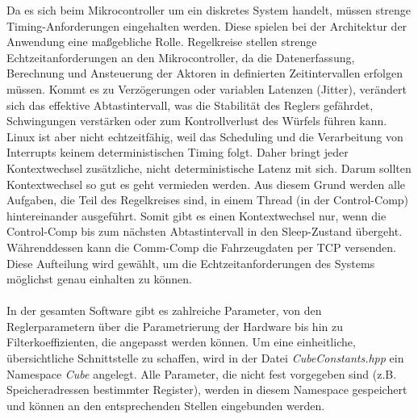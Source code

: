         Da es sich beim Mikrocontroller um ein diskretes System handelt, müssen strenge Timing-Anforderungen eingehalten werden. Diese spielen bei der Architektur der Anwendung eine maßgebliche Rolle. Regelkreise stellen strenge Echtzeitanforderungen an den Mikrocontroller, da die Datenerfassung, Berechnung und Ansteuerung der Aktoren in definierten Zeitintervallen erfolgen müssen. Kommt es zu Verzögerungen oder variablen Latenzen (Jitter), verändert sich das effektive Abtastintervall, was die Stabilität des Reglers gefährdet, Schwingungen verstärken oder zum Kontrollverlust des Würfels führen kann. Linux ist aber nicht echtzeitfähig, weil das Scheduling und die Verarbeitung von Interrupts keinem deterministischen Timing folgt. Daher bringt jeder Kontextwechsel zusätzliche, nicht deterministische Latenz mit sich. Darum sollten Kontextwechsel so gut es geht vermieden werden. Aus diesem Grund werden alle Aufgaben, die Teil des Regelkreises sind, in einem Thread (in der Control-Comp) hintereinander ausgeführt. Somit gibt es einen Kontextwechsel nur, wenn die Control-Comp bis zum nächsten Abtastintervall in den Sleep-Zustand übergeht. Währenddessen kann die Comm-Comp die Fahrzeugdaten per TCP versenden. Diese Aufteilung wird gewählt, um die Echtzeitanforderungen des Systems möglichst genau einhalten zu können.\\
        \\
        In der gesamten Software gibt es zahlreiche Parameter, von den Reglerparametern über die Parametrierung der Hardware bis hin zu Filterkoeffizienten, die angepasst werden können. Um eine einheitliche, übersichtliche Schnittstelle zu schaffen, wird in der Datei \textit{CubeConstants.hpp} ein Namespace \textit{Cube} angelegt. Alle Parameter, die nicht fest vorgegeben sind (z.B. Speicheradressen bestimmter Register), werden in diesem Namespace gespeichert und können an den entsprechenden Stellen eingebunden werden.
    
